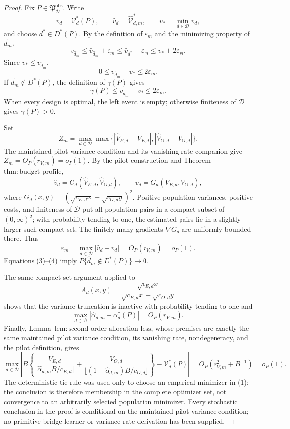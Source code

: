\documentclass{article}
\begin{document}
\begin{proof}
Fix \(P\in\mathfrak P_{\mathcal D}^{\mathrm{obs}}\).  Write
\[
 v_d=\mathcal V_d^*(P),\qquad
 \widehat v_d=\widehat{\mathcal V}_{d,m}^*,
 \qquad v_*=\min_{d\in\mathcal D}v_d,
\]
and choose \(d^*\in D^*(P)\).  By the definition of \(\varepsilon_m\) and the minimizing property of \(\widehat d_m\),
\[
 v_{\widehat d_m}
 \le \widehat v_{\widehat d_m}+\varepsilon_m
 \le \widehat v_{d^*}+\varepsilon_m
 \le v_*+2\varepsilon_m. \tag{1}
\]
Since \(v_*\le v_{\widehat d_m}\),
\[
 0\le v_{\widehat d_m}-v_*\le2\varepsilon_m. \tag{2}
\]
If \(\widehat d_m\notin D^*(P)\), the definition of \(\gamma(P)\) gives
\[
 \gamma(P)\le v_{\widehat d_m}-v_*\le2\varepsilon_m. \tag{3}
\]
When every design is optimal, the left event is empty; otherwise finiteness of \(\mathcal D\) gives \(\gamma(P)>0\).

Set
\[
 Z_m=\max_{d\in\mathcal D}\max\bigl\{|\widehat V_{E,d}-V_{E,d}|,
 |\widehat V_{O,d}-V_{O,d}|\bigr\}.
\]
The maintained pilot variance condition and its vanishing-rate companion give \(Z_m=O_P(r_{V,m})=o_P(1)\).  By the pilot construction and Theorem~\(\mathrm{thm{:}budget\text{-}profile}\),
\[
 \widehat v_d=G_d(\widehat V_{E,d},\widehat V_{O,d}),
 \qquad v_d=G_d(V_{E,d},V_{O,d}),
\]
where \(G_d(x,y)=(\sqrt{c_{E,d}x}+\sqrt{c_{O,d}y})^2\).  Positive population variances, positive costs, and finiteness of \(\mathcal D\) put all population pairs in a compact subset of \((0,\infty)^2\); with probability tending to one, the estimated pairs lie in a slightly larger such compact set.  The finitely many gradients \(\nabla G_d\) are uniformly bounded there.  Thus
\[
 \varepsilon_m=\max_{d\in\mathcal D}|\widehat v_d-v_d|
 =O_P(r_{V,m})=o_P(1). \tag{4}
\]
Equations (3)--(4) imply \(P\{\widehat d_m\notin D^*(P)\}\to0\).

The same compact-set argument applied to
\[
 A_d(x,y)=\frac{\sqrt{c_{E,d}x}}
 {\sqrt{c_{E,d}x}+\sqrt{c_{O,d}y}}
\]
shows that the variance truncation is inactive with probability tending to one and
\[
 \max_{d\in\mathcal D}|\widehat\alpha_{d,m}-\alpha_d^*(P)|
 =O_P(r_{V,m}). \tag{5}
\]
Finally, Lemma~\(\mathrm{lem{:}second\text{-}order\text{-}allocation\text{-}loss}\), whose premises are exactly the same maintained pilot variance condition, its vanishing rate, nondegeneracy, and the pilot definition, gives
\[
\max_{d\in\mathcal D}\left|B\left\{
\frac{V_{E,d}}{\lfloor\widehat\alpha_{d,m}B/c_{E,d}\rfloor}
+\frac{V_{O,d}}{\lfloor(1-\widehat\alpha_{d,m})B/c_{O,d}\rfloor}
\right\}-\mathcal V_d^*(P)\right|
=O_P(r_{V,m}^2+B^{-1})=o_P(1).
\]
The deterministic tie rule was used only to choose an empirical minimizer in (1); the conclusion is therefore membership in the complete optimizer set, not convergence to an arbitrarily selected population minimizer.  Every stochastic conclusion in the proof is conditional on the maintained pilot variance condition; no primitive bridge learner or variance-rate derivation has been supplied.
\end{proof}
\end{document}
